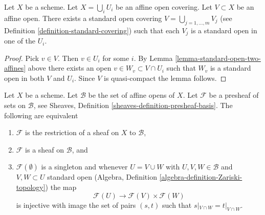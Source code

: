 \begin{lemma}
\label{lemma-good-subcover}
Let $X$ be a scheme.
Let $X = \bigcup_i U_i$ be an affine open covering.
Let $V \subset X$ be an affine open.
There exists a standard open covering
$V = \bigcup_{j = 1, \ldots, m} V_j$ (see
Definition \ref{definition-standard-covering})
such that each $V_j$ is a standard open in one of the $U_i$.
\end{lemma}

\begin{proof}
Pick $v \in V$. Then $v \in U_i$ for some $i$.
By Lemma \ref{lemma-standard-open-two-affines} above there exists an open
$v \in W_v \subset V \cap U_i$ such that
$W_v$ is a standard open in both $V$ and $U_i$.
Since $V$ is quasi-compact the lemma follows.
\end{proof}

\begin{lemma}
\label{lemma-sheaf-on-affines}
Let $X$ be a scheme. Let $\mathcal{B}$ be the set of affine opens of $X$.
Let $\mathcal{F}$ be a presheaf of sets on $\mathcal{B}$, see
Sheaves, Definition \ref{sheaves-definition-presheaf-basis}. The following
are equivalent
\begin{enumerate}
\item $\mathcal{F}$ is the restriction of a sheaf on $X$ to $\mathcal{B}$,
\item $\mathcal{F}$ is a sheaf on $\mathcal{B}$, and
\item $\mathcal{F}(\emptyset)$ is a singleton and
whenever $U = V \cup W$ with $U, V, W \in \mathcal{B}$ and
$V, W \subset U$ standard open
(Algebra, Definition \ref{algebra-definition-Zariski-topology})
the map
$$
\mathcal{F}(U) \longrightarrow \mathcal{F}(V) \times \mathcal{F}(W)
$$
is injective with image the set of pairs $(s, t)$
such that $s|_{V \cap W} = t|_{V \cap W}$.
\end{enumerate}
\end{lemma}

